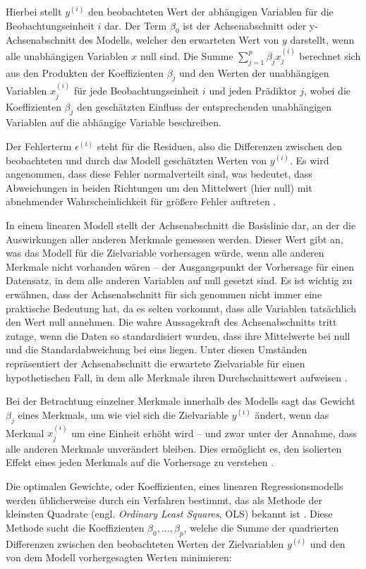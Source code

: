 Hierbei stellt $y^{(i)}$ den beobachteten Wert der abhängigen Variablen für die Beobachtungseinheit
$i$ dar. Der Term $\beta_0$ ist der Achsenabschnitt oder y-Achsenabschnitt des Modells, 
welcher den erwarteten Wert von $y$ darstellt, wenn alle unabhängigen Variablen $x$ null sind. 
Die Summe $\sum_{j=1}^{p} \beta_j x^{(i)}_j$ berechnet sich aus den Produkten der Koeffizienten 
$\beta_j$ und den Werten der unabhängigen Variablen $x^{(i)}_j$ für jede Beobachtungseinheit $i$ 
und jeden Prädiktor $j$, wobei die Koeffizienten $\beta_j$ den geschätzten Einfluss der 
entsprechenden unabhängigen Variablen auf die abhängige Variable beschreiben.

Der Fehlerterm $\epsilon^{(i)}$ steht für die Residuen, also die Differenzen zwischen den beobachteten 
und durch das Modell geschätzten Werten von $y^{(i)}$. Es wird angenommen, dass diese Fehler normalverteilt sind, 
was bedeutet, dass Abweichungen in beiden Richtungen um den Mittelwert (hier null) 
mit abnehmender Wahrscheinlichkeit für größere Fehler auftreten \cite[S. 37]{Molnar_2022}.

In einem linearen Modell stellt der Achsenabschnitt die Basislinie dar, an der die Auswirkungen aller 
anderen Merkmale gemessen werden. Dieser Wert gibt an, was das Modell für die Zielvariable vorhersagen 
würde, wenn alle anderen Merkmale nicht vorhanden wären – der Ausgangspunkt der Vorhersage 
für einen Datensatz, in dem alle anderen Variablen auf null gesetzt sind. 
Es ist wichtig zu erwähnen, dass der Achsenabschnitt für sich genommen nicht immer eine praktische 
Bedeutung hat, da es selten vorkommt, dass alle Variablen tatsächlich den Wert null annehmen. 
Die wahre Aussagekraft des Achsenabschnitts tritt zutage, wenn die Daten so standardisiert wurden, 
dass ihre Mittelwerte bei null und die Standardabweichung bei eins liegen. Unter diesen Umständen repräsentiert der Achsenabschnitt 
die erwartete Zielvariable für einen hypothetischen Fall, in dem alle Merkmale ihren Durchschnittswert 
aufweisen \cite[S. 39]{Molnar_2022}.

Bei der Betrachtung einzelner Merkmale innerhalb des Modells sagt das Gewicht $\beta_j$ eines Merkmals, 
um wie viel sich die Zielvariable $y^{(i)}$ ändert, wenn das Merkmal $x^{(i)}_j$ um eine Einheit erhöht wird – und zwar unter 
der Annahme, dass alle anderen Merkmale unverändert bleiben. 
Dies ermöglicht es, den isolierten Effekt eines jeden Merkmals auf die Vorhersage zu verstehen \cite[S. 39]{Molnar_2022}.

Die optimalen Gewichte, oder Koeffizienten, eines linearen Regressionsmodells werden üblicherweise durch ein Verfahren bestimmt, 
das als Methode der kleinsten Quadrate (engl. \textit{Ordinary Least Squares}, OLS) bekannt ist \cite[S. 37]{Molnar_2022}. 
Diese Methode sucht die Koeffizienten \( \beta_0, \ldots, \beta_p \), welche die Summe der quadrierten 
Differenzen zwischen den beobachteten Werten der Zielvariablen \( y^{(i)} \) und den von dem Modell 
vorhergesagten Werten minimieren:

